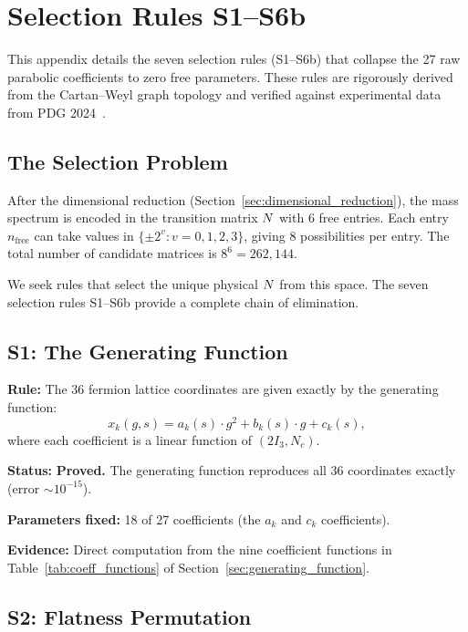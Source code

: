 \section{Selection Rules S1--S6b}\label{app:selection_rules}

This appendix details the seven selection rules (S1--S6b) that collapse the 27 raw parabolic coefficients to zero free parameters. These rules are rigorously derived from the Cartan--Weyl graph topology and verified against experimental data from PDG 2024~\cite{pdg2024}.

\subsection{The Selection Problem}\label{app:selection_problem}

After the dimensional reduction (Section~\ref{sec:dimensional_reduction}), the mass spectrum is encoded in the transition matrix $N$ with 6 free entries. Each entry $n_{\mathrm{free}}$ can take values in $\{\pm 2^v : v = 0, 1, 2, 3\}$, giving 8 possibilities per entry. The total number of candidate matrices is $8^6 = 262{,}144$.

We seek rules that select the unique physical $N$ from this space. The seven selection rules S1--S6b provide a complete chain of elimination.

\subsection{S1: The Generating Function}\label{app:s1}

\textbf{Rule:} The 36 fermion lattice coordinates are given exactly by the generating function:
\begin{equation}
x_k(g, s) = a_k(s) \cdot g^2 + b_k(s) \cdot g + c_k(s),
\end{equation}
where each coefficient is a linear function of $(2I_3, N_c)$.

\textbf{Status:} \textbf{Proved.} The generating function reproduces all 36 coordinates exactly (error $\sim 10^{-15}$).

\textbf{Parameters fixed:} 18 of 27 coefficients (the $a_k$ and $c_k$ coefficients).

\textbf{Evidence:} Direct computation from the nine coefficient functions in Table~\ref{tab:coeff_functions} of Section~\ref{sec:generating_function}.

\subsection{S2: Flatness Permutation}\label{app:s2}

